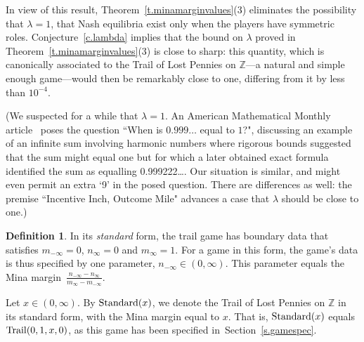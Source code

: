 \documentclass[letterpaper,11pt,oneside,reqno]{amsbook}
\newcommand{\Z}{\ensuremath{\mathbb{Z}}}
\numberwithin{figure}{chapter}
\theoremstyle{definition}
\theoremstyle{definition}
\theoremstyle{definition}
\newtheorem{definition}[theorem]{Definition}
\theoremstyle{definition}
\theoremstyle{definition}
\newcommand{\game}{{\rm Trail}}
\newcommand{\standard}{{\rm Standard}}
\begin{document}
 In view of this result, 
 Theorem~\ref{t.minamarginvalues}(3) eliminates the possibility that $\lambda =1$, that Nash equilibria exist only when the players have symmetric roles. 
Conjecture~\ref{c.lambda} implies that the bound on $\lambda$ proved in 
 Theorem~\ref{t.minamarginvalues}(3)  is close to sharp: this quantity, which is canonically associated to the Trail of Lost Pennies on $\Z$---a natural and simple enough game---would then be remarkably close to one, differing from it by less than $10^{-4}$. 

(We suspected for a while that $\lambda =1$. An American Mathematical Monthly article~\cite{PS07} poses the question ``When is $0.999 \ldots$ equal to $1$?", discussing an example of an infinite sum involving harmonic numbers where rigorous bounds suggested that the sum might equal one but for which a later obtained exact formula identified the sum as equalling 0.999222\ldots. Our situation is similar, and might even permit an extra `9' in the posed question. There are differences as well: the premise ``Incentive Inch, Outcome Mile" advances a case that $\lambda$ should be close to one.)
 
 \begin{definition}\label{d.standard}
In its {\em standard} form, the trail game has boundary data that satisfies $m_{-\infty} = 0$, $n_\infty = 0$ and $m_\infty = 1$.
For a game in this form, the game's data is thus specified by one parameter, $n_{-\infty} \in (0,\infty)$. This parameter equals the Mina margin~$\frac{n_{-\infty} - n_\infty}{m_\infty - m_{-\infty}}$.
\end{definition}
  
  Let $x \in (0,\infty)$. By $\standard(x)$, we denote the Trail of Lost Pennies on $\Z$  in its standard form, with the Mina margin equal to $x$.
  That is, $\standard(x)$ equals $\game(0,1,x,0)$, as this game has been specified in~Section~\ref{s.gamespec}.
 
\end{document}
